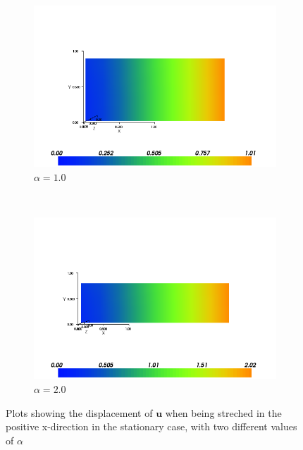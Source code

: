 \documentclass[twoside]{article}
\begin{document}
\begin{figure}
        \centering
        \begin{subfigure}[h]{0.51\textwidth}
                \centering
                \includegraphics[width=\textwidth]{stat_a=1}
                \caption{\( \alpha = 1.0\)}
                \label{fig:stat_a=1}
        \end{subfigure}%
        ~ %
        \begin{subfigure}[h]{0.51\textwidth}
                \centering
                \includegraphics[width=\textwidth]{stat_a=2}
                \caption{\( \alpha = 2.0\)}
                \label{fig:stat_a=2}
        \end{subfigure}
        \caption{Plots showing the displacement of \( \mathbf{u}\) when being streched in the positive x-direction in the stationary case, with two different values of \( \alpha\)}
\end{figure}
\end{document}
